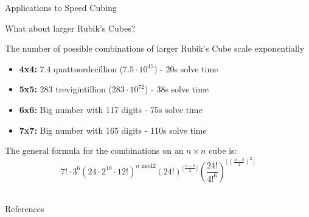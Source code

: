 \documentclass[final]{beamer}
\newlength{\colwidth}
\begin{document}
\begin{frame}[t]
\begin{columns}[t]
\begin{column}{\colwidth}
\begin{block}{Applications to Speed Cubing}
  \end{block}

  \begin{block}{What about larger Rubik's Cubes?}
    
    \large The number of possible combinations of larger Rubik's Cube scale exponentially \\
    
    \begin{itemize}
      \item \textbf{4x4:} 7.4 quattuordecillion ($7.5\cdot 10^{45}$) - 20s solve time
      \item \textbf{5x5:} 283 trevigintillion ($283 \cdot 10^{72}$) - 38s solve time
      \item \textbf{6x6:} Big number with 117 digits - 75s solve time
      \item \textbf{7x7:} Big number with 165 digits - 110s solve time
    \end{itemize}

    The general formula for the combinations on an $n \times n$ cube is: \\

    $$ \displaystyle 7! \cdot  3^6 \left( 24 \cdot 2^{10} \cdot 12!  \right)^{n \text{ mod} 2}
    (24!)^{\lfloor \frac{n-2}{2} \rfloor} \left( \displaystyle\frac{24!}{4!^{6}} 
    \right)^{\lfloor \left( \frac{n-2}{2} \right)^2 \rfloor} $$ \\


  \end{block}

  \begin{block}{References}


\end{block}
\end{column}
\end{columns}
\end{frame}
\end{document}
